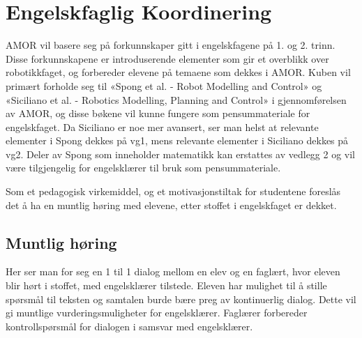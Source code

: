 \section*{Engelskfaglig Koordinering} \label{Sec: Engelskfaglig_Koordinering}

AMOR vil basere seg på forkunnskaper gitt i engelskfagene på 1. og 2. trinn.
Disse forkunnskapene er introduserende elementer som gir et overblikk over robotikkfaget, og forbereder elevene på temaene som dekkes i AMOR.
Kuben vil primært forholde seg til «Spong et al. - Robot Modelling and Control» og «Siciliano et al. - Robotics Modelling, Planning and Control» i gjennomførelsen av AMOR, og disse bøkene vil kunne fungere som pensummateriale for engelskfaget.
Da Siciliano er noe mer avansert, ser man helst at relevante elementer i Spong dekkes på vg1, mens relevante elementer i Siciliano dekkes på vg2.
Deler av Spong som inneholder matematikk kan erstattes av vedlegg 2 og vil være tilgjengelig for engelsklærer til bruk som pensummateriale.

Som et pedagogisk virkemiddel, og et motivasjonstiltak for studentene foreslås det å ha en muntlig høring med elevene, etter stoffet i engelskfaget er dekket.

	\subsection*{Muntlig høring}
			Her ser man for seg en 1 til 1 dialog mellom en elev og en faglært, hvor eleven blir hørt i stoffet, med engelsklærer tilstede.
			Eleven har mulighet til å stille spørsmål til teksten og samtalen burde bære preg av kontinuerlig dialog. Dette vil gi muntlige vurderingsmuligheter for engelsklærer. Faglærer forbereder kontrollspørsmål for dialogen i samsvar med engelsklærer.

